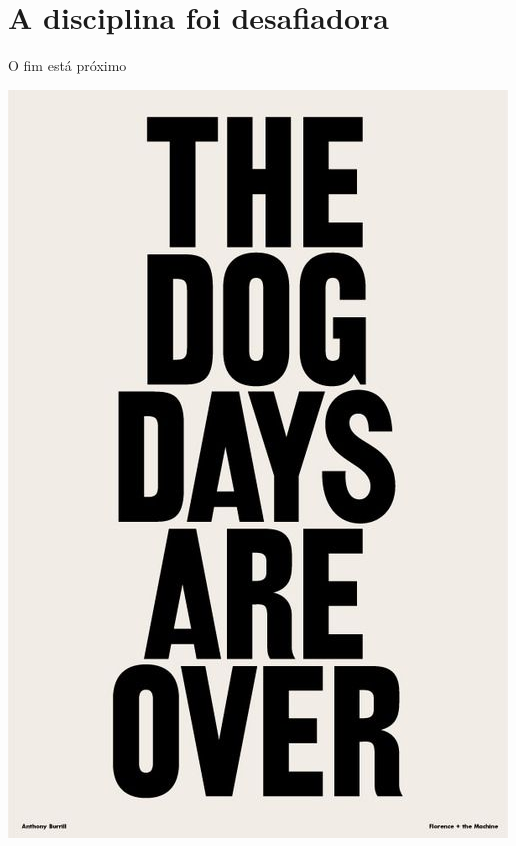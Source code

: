 \documentclass{beamer}
\begin{document}
\section{A disciplina foi desafiadora}

\begin{frame}{O fim está próximo}
  \begin{center}
    \includegraphics[height=.75\textheight]{Encerramento/dogdaysareover}

    \vfill
  \end{center}
\end{frame}
\end{document}
